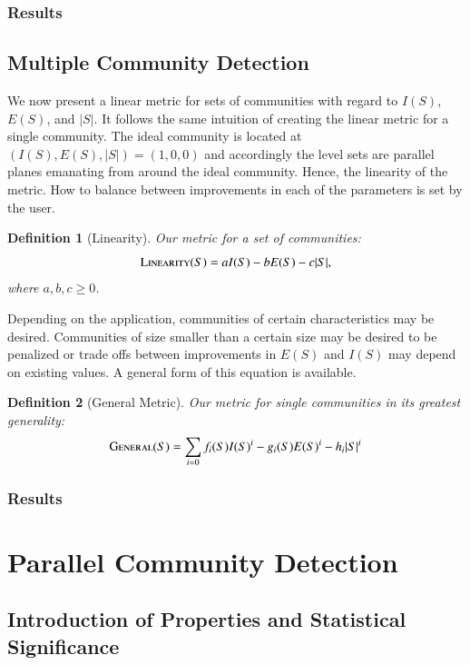 \documentclass[phd,tocprelim]{cornell}
\newtheorem{definition}{Definition}
\begin{document}
\subsection{Results}

\section{Multiple Community Detection}


We now present a linear metric for sets of communities with regard to $I(S)$, $E(S)$, and $|S|$.  It follows the same intuition of creating the linear metric for a single community.  The ideal community is located at $(I(S), E(S), |S|) = (1, 0, 0)$ and accordingly the level sets are parallel planes emanating from around the ideal community.  Hence, the linearity of the metric.  How to balance between improvements in each of the parameters is set by the user.
\begin{definition}[Linearity]
 Our metric for a set of communities:
  \begin{equation}
   \mbox{\sc Linearity}(S) = a I(S) - b E(S) - c |S|,
  \end{equation}
where $a,b,c \geq 0$.
\end{definition}
Depending on the application, communities of certain characteristics may be desired.  Communities of size smaller than a certain size may be desired to be penalized or trade offs between improvements in $E(S)$ and $I(S)$ may depend on existing values.  A general form of this equation is available.
\begin{definition}[General Metric]
 Our metric for single communities in its greatest generality:
  \begin{equation}
   \mbox{\sc General} (S) = \sum\limits_{i = 0} f_i(S) I(S)^i - g_i(S) E(S)^i - h_i |S|^i
  \end{equation}
\end{definition}



\subsection{Results}

\chapter{Parallel Community Detection}

\section {Introduction of Properties and Statistical Significance}
\end{document}
